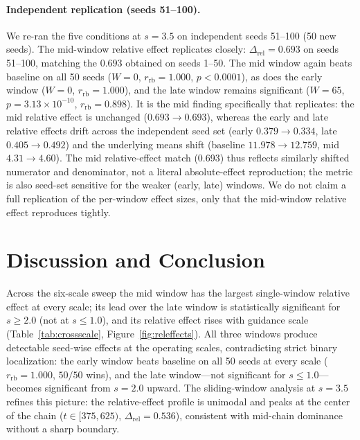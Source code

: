 \documentclass[10pt]{article}
\begin{document}
\paragraph{Independent replication (seeds 51--100).}
We re-ran the five conditions at $s=3.5$ on independent seeds 51--100 (50 new
seeds).  The mid-window relative effect replicates closely: $\Delta_\mathrm{rel}
= 0.693$ on seeds 51--100, matching the $0.693$ obtained on seeds 1--50.  The
mid window again beats baseline on all 50 seeds ($W=0$, $r_\mathrm{rb}=1.000$,
$p<0.0001$), as does the early window ($W=0$, $r_\mathrm{rb}=1.000$), and the
late window remains significant ($W=65$, $p=3.13\times10^{-10}$,
$r_\mathrm{rb}=0.898$).  It is the mid finding specifically that replicates: the
mid relative effect is unchanged ($0.693\to0.693$), whereas the early and late
relative effects drift across the independent seed set (early $0.379\to0.334$,
late $0.405\to0.492$) and the underlying means shift (baseline $11.978\to12.759$,
mid $4.31\to4.60$).  The mid relative-effect match (0.693) thus reflects
similarly shifted numerator and denominator, not a literal absolute-effect
reproduction; the metric is also seed-set sensitive for the weaker (early, late)
windows.  We do not claim a full replication of the per-window effect sizes, only
that the mid-window relative effect reproduces tightly.

\section{Discussion and Conclusion}
\label{sec:discussion}

Across the six-scale sweep the mid window has the largest single-window relative
effect at every scale; its lead over the late window is statistically significant
for $s\ge2.0$ (not at $s\le1.0$), and its relative effect rises with guidance
scale (Table~\ref{tab:crossscale}, Figure~\ref{fig:releffects}).  All three
windows produce detectable seed-wise effects at the operating scales,
contradicting strict binary localization: the early window beats baseline on all
50 seeds at every scale ($r_\mathrm{rb}=1.000$, $50/50$ wins), and the late
window---not significant for $s\le 1.0$---becomes significant from $s=2.0$
upward.  The sliding-window analysis at $s=3.5$ refines this picture: the
relative-effect profile is unimodal and peaks at the center of the chain
($t\!\in\![375,625)$, $\Delta_\mathrm{rel}=0.536$), consistent with mid-chain
dominance without a sharp boundary.
\end{document}
